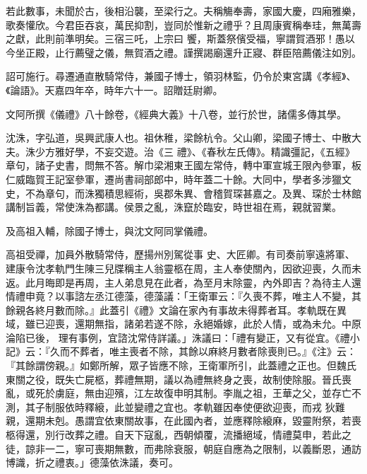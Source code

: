 \begin{pinyinscope}
 若此數事，未聞於古，後相沿襲，至梁行之。夫稱觴奉壽，家國大慶，四廂雅樂，歌奏懽欣。今君臣吞哀，萬民抑割，豈同於惟新之禮乎？且周康賓稱奉珪，無萬壽之獻，此則前準明矣。三宿三吒，上宗曰
 饗，斯蓋祭儐受福，寧謂賀酒邪！愚以今坐正殿，止行薦璧之儀，無賀酒之禮。謹撰謁廟還升正寢、群臣陪薦儀注如別。



 詔可施行。尋遷通直散騎常侍，兼國子博士，領羽林監，仍令於東宮講《孝經》、《論語》。天嘉四年卒，時年六十一。詔贈廷尉卿。



 文阿所撰《儀禮》八十餘卷，《經典大義》十八卷，並行於世，諸儒多傳其學。



 沈洙，字弘道，吳興武康人也。祖休稚，梁餘杭令。父山卿，梁國子博士、中散大夫。洙少方雅好學，不妄交遊。治《三
 禮》、《春秋左氏傳》。精識彊記，《五經》章句，諸子史書，問無不答。解巾梁湘東王國左常侍，轉中軍宣城王限內參軍，板仁威臨賀王記室參軍，遷尚書祠部郎中，時年蓋二十餘。大同中，學者多涉獵文史，不為章句，而洙獨積思經術，吳郡朱異、會稽賀琛甚嘉之。及異、琛於士林館講制旨義，常使洙為都講。侯景之亂，洙竄於臨安，時世祖在焉，親就習業。



 及高祖入輔，除國子博士，與沈文阿同掌儀禮。



 高祖受禪，加員外散騎常侍，歷揚州別駕從事
 史、大匠卿。有司奏前寧遠將軍、建康令沈孝軌門生陳三兒牒稱主人翁靈柩在周，主人奉使關內，因欲迎喪，久而未返。此月晦即是再周，主人弟息見在此者，為至月末除靈，內外即吉？為待主人還情禮申竟？以事諮左丞江德藻，德藻議：「王衛軍云：『久喪不葬，唯主人不變，其餘親各終月數而除。』此蓋引《禮》文論在家內有事故未得葬者耳。孝軌既在異域，雖已迎喪，還期無指，諸弟若遂不除，永絕婚嫁，此於人情，或為未允。中原淪陷已後，
 理有事例，宜諮沈常侍詳議。」洙議曰：「禮有變正，又有從宜。《禮小記》云：『久而不葬者，唯主喪者不除，其餘以麻終月數者除喪則已。』《注》云：『其餘謂傍親。』如鄭所解，眾子皆應不除，王衛軍所引，此蓋禮之正也。但魏氏東關之役，既失亡屍柩，葬禮無期，議以為禮無終身之喪，故制使除服。晉氏喪亂，或死於虜庭，無由迎殯，江左故復申明其制。李胤之祖，王華之父，並存亡不測，其子制服依時釋縗，此並變禮之宜也。孝軌雖因奉使便欲迎喪，而戎
 狄難親，還期未剋。愚謂宜依東關故事，在此國內者，並應釋除縗麻，毀靈附祭，若喪柩得還，別行改葬之禮。自天下寇亂，西朝傾覆，流播絕域，情禮莫申，若此之徒，諒非一二，寧可喪期無數，而弗除衰服，朝庭自應為之限制，以義斷恩，通訪博識，折之禮衷。」德藻依洙議，奏可。




\end{pinyinscope}
